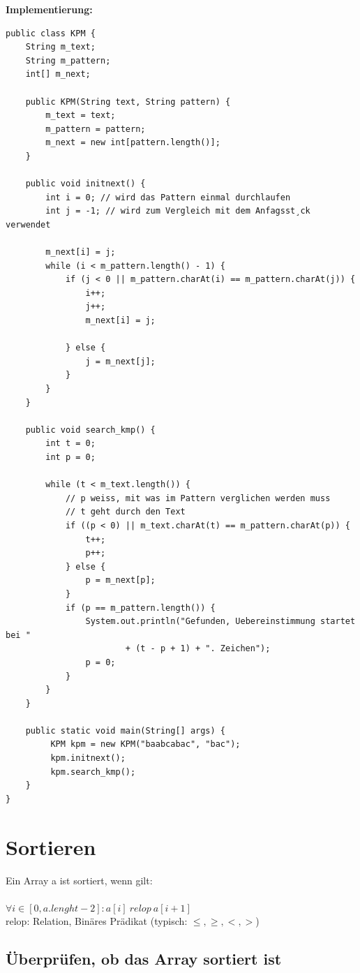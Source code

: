 \documentclass[a4paper,10pt]{article}
\newcommand{\Bold}[1]{\textbf{#1}} %
\begin{document}
\Bold{Implementierung:}

\begin{lstlisting}
public class KPM {
    String m_text;
    String m_pattern;
    int[] m_next;

    public KPM(String text, String pattern) {
        m_text = text;
        m_pattern = pattern;
        m_next = new int[pattern.length()];
    }
    
    public void initnext() {
        int i = 0; // wird das Pattern einmal durchlaufen
        int j = -1; // wird zum Vergleich mit dem Anfagsst¸ck verwendet

        m_next[i] = j;
        while (i < m_pattern.length() - 1) {
            if (j < 0 || m_pattern.charAt(i) == m_pattern.charAt(j)) {
                i++;
                j++;
                m_next[i] = j;

            } else {
                j = m_next[j];
            }
        }
    }

    public void search_kmp() {
        int t = 0;
        int p = 0;

        while (t < m_text.length()) {
            // p weiss, mit was im Pattern verglichen werden muss
            // t geht durch den Text
            if ((p < 0) || m_text.charAt(t) == m_pattern.charAt(p)) {
                t++;
                p++;
            } else {
                p = m_next[p];
            }
            if (p == m_pattern.length()) {
                System.out.println("Gefunden, Uebereinstimmung startet bei "
                        + (t - p + 1) + ". Zeichen");
                p = 0;
            }
        }
    }   
    
    public static void main(String[] args) {
         KPM kpm = new KPM("baabcabac", "bac");
         kpm.initnext();
         kpm.search_kmp();
    }
}
\end{lstlisting}

\newpage
\section{Sortieren}
Ein Array a ist sortiert, wenn gilt: \\ \\
$ \forall i \in [0, a.lenght-2] : a[i]\ relop\ a[i+1]$ \\
relop: Relation, Bin\"ares Pr\"adikat (typisch: $\leq,\geq,<,>$)

\subsection{\"Uberpr\"ufen, ob das Array sortiert ist}
\end{document}
